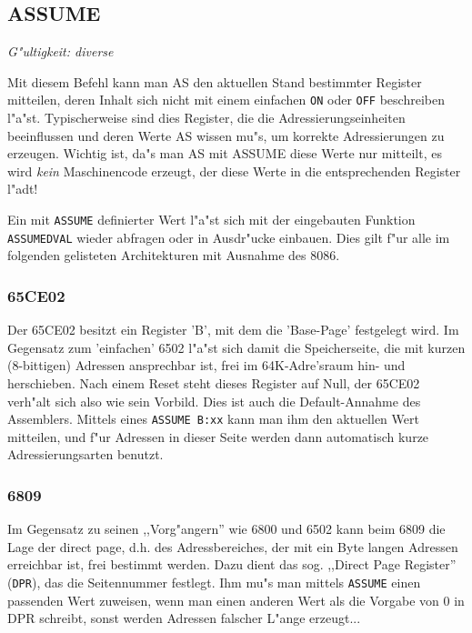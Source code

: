 \documentclass[12pt,a4paper,twoside]{report}
\makeatletter
\newcommand{\tty}[1]{{\tt #1}}
\newcommand{\ttindex}[1]{\index{#1@{\tt #1}}}
\makeatother
\begin{document}
\subsection{ASSUME}
\ttindex{ASSUME}


{\em G"ultigkeit: diverse}

Mit diesem Befehl kann man AS den aktuellen Stand bestimmter Register
mitteilen, deren Inhalt sich nicht mit einem einfachen \tty{ON} oder
\tty{OFF} beschreiben l"a"st.  Typischerweise sind dies Register, die die
Adressierungseinheiten beeinflussen und deren Werte AS wissen mu"s, um
korrekte Adressierungen zu erzeugen.  Wichtig ist, da"s man AS mit ASSUME
diese Werte nur mitteilt, es wird {\em kein} Maschinencode erzeugt, der
diese Werte in die entsprechenden Register l"adt!

Ein mit \tty{ASSUME} definierter Wert l"a"st sich mit der
eingebauten Funktion \tty{ASSUMEDVAL} wieder abfragen oder in
Ausdr"ucke einbauen.  Dies gilt f"ur alle im folgenden gelisteten
Architekturen mit Ausnahme des 8086.


\subsubsection{65CE02}

Der 65CE02 besitzt ein Register 'B', mit dem die 'Base-Page' festgelegt wird.
Im Gegensatz zum 'einfachen' 6502 l"a"st sich damit die Speicherseite, die
mit kurzen (8-bittigen) Adressen ansprechbar ist, frei im 64K-Adre'sraum hin-
und herschieben.  Nach einem Reset steht dieses Register auf Null, der 65CE02
verh"alt sich also wie sein Vorbild.  Dies ist auch die Default-Annahme des
Assemblers.  Mittels eines \tty{ASSUME B:xx} kann man ihm den aktuellen Wert
mitteilen, und f"ur Adressen in dieser Seite werden dann automatisch kurze
Adressierungsarten benutzt.


\subsubsection{6809}

Im Gegensatz zu seinen ,,Vorg"angern'' wie 6800 und 6502 kann beim
6809 die Lage der direct page, d.h. des Adressbereiches, der mit ein
Byte langen Adressen erreichbar ist, frei bestimmt werden.  Dazu dient
das sog. ,,Direct Page Register'' (\tty{DPR}), das die Seitennummer
festlegt.  Ihm mu"s man mittels \tty{ASSUME} einen passenden Wert
zuweisen, wenn man einen anderen Wert als die Vorgabe von 0 in DPR
schreibt, sonst werden Adressen falscher L"ange erzeugt...
\end{document}
